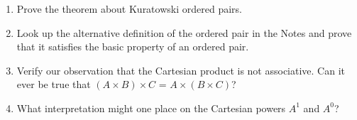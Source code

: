 \Exercises

\begin{enumerate}

\item  Prove the theorem about Kuratowski ordered pairs.

\item  Look up the alternative definition of the ordered pair in the Notes and prove that it satisfies
  the basic property of an ordered pair.

\item  Verify our observation that the Cartesian
  product is not associative.  Can it ever be true that $(A \times B)\times C$
  = $A \times(B \times C)$?

\item What interpretation might one place on the Cartesian
  powers $A^1$ and $A^0$?

\end{enumerate}
